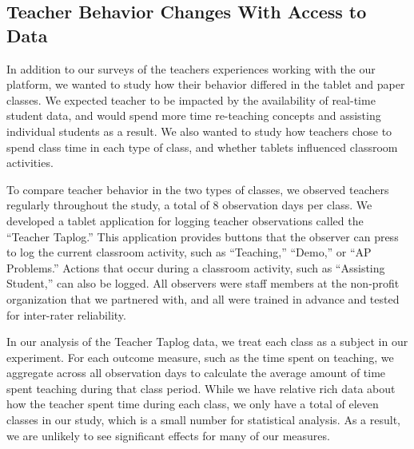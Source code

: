 \documentclass{sigchi}
\begin{document}
\subsection{Teacher Behavior Changes With Access to Data}
In addition to our surveys of the teachers experiences working with the our platform, we wanted to study how their behavior differed in the tablet and paper classes. We expected teacher to be impacted by the availability of real-time student data, and would spend more time re-teaching concepts and assisting individual students as a result. We also wanted to study how teachers chose to spend class time in each type of class, and whether tablets influenced classroom activities.

To compare teacher behavior in the two types of classes, we observed teachers regularly throughout the study, a total of 8 observation days per class. We developed a tablet application for logging teacher observations called the ``Teacher Taplog.'' This application provides buttons that the observer can press to log the current classroom activity, such as ``Teaching,'' ``Demo,'' or ``AP Problems.'' Actions that occur during a classroom activity, such as ``Assisting Student,'' can also be logged. All observers were staff members at the non-profit organization that we partnered with, and all were trained in advance and tested for inter-rater reliability.

In our analysis of the Teacher Taplog data, we treat each class as a subject in our experiment. For each outcome measure, such as the time spent on teaching, we aggregate across all observation days to calculate the average amount of time spent teaching during that class period. While we have relative rich data about how the teacher spent time during each class, we only have a total of eleven classes in our study, which is a small number for statistical analysis. As a result, we are unlikely to see significant effects for many of our measures.
\end{document}
